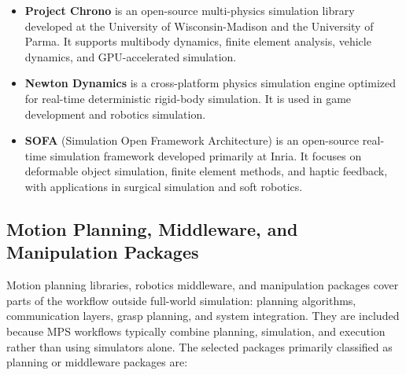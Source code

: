 \begin{itemize}
    \item \textbf{Project Chrono} is an open-source multi-physics simulation library developed at the University of Wisconsin-Madison and the University of Parma. It supports multibody dynamics, finite element analysis, vehicle dynamics, and GPU-accelerated simulation.
    \item \textbf{Newton Dynamics} is a cross-platform physics simulation engine optimized for real-time deterministic rigid-body simulation. It is used in game development and robotics simulation.
    \item \textbf{SOFA} (Simulation Open Framework Architecture) is an open-source real-time simulation framework developed primarily at Inria. It focuses on deformable object simulation, finite element methods, and haptic feedback, with applications in surgical simulation and soft robotics.
\end{itemize}

\subsection{Motion Planning, Middleware, and Manipulation Packages}
\label{subsec:motion-planning-middleware-manipulation}

Motion planning libraries, robotics middleware, and manipulation packages cover parts of the workflow outside full-world simulation: planning algorithms, communication layers, grasp planning, and system integration. They are included because MPS workflows typically combine planning, simulation, and execution rather than using simulators alone. The selected packages primarily classified as planning or middleware packages are:


